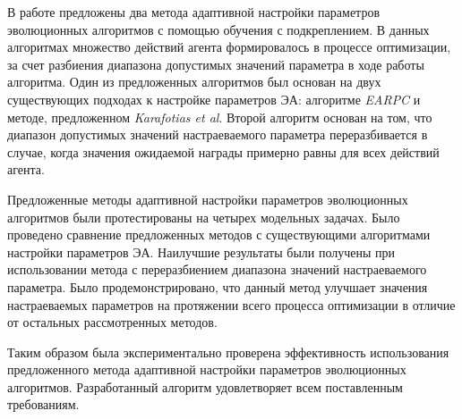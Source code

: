 \startconclusionpage

В работе предложены два метода адаптивной настройки параметров эволюционных алгоритмов с помощью обучения с подкреплением. В данных алгоритмах множество действий агента формировалось в процессе оптимизации, за счет разбиения диапазона допустимых значений параметра в ходе работы алгоритма. Один из предложенных алгоритмов был основан на двух существующих подходах к настройке параметров ЭА: алгоритме \textit{EARPC} и методе, предложенном \textit{Karafotias et al}. Второй алгоритм основан на том, что диапазон допустимых значений настраеваемого параметра переразбивается в случае, когда значения ожидаемой награды примерно равны для всех действий агента. 

Предложенные методы адаптивной настройки параметров эволюционных алгоритмов были протестированы на четырех модельных задачах. Было проведено сравнение предложенных методов с существующими алгоритмами настройки параметров ЭА. Наилучшие результаты были получены при использовании метода с переразбиением диапазона значений настраеваемого параметра. Было продемонстрировано, что данный метод улучшает значения настраеваемых параметров на протяжении всего процесса оптимизации в отличие от остальных рассмотренных методов.

Таким образом была экспериментально проверена эффективность использования предложенного метода адаптивной настройки параметров эволюционных алгоритмов. Разработанный алгоритм удовлетворяет всем поставленным требованиям.
